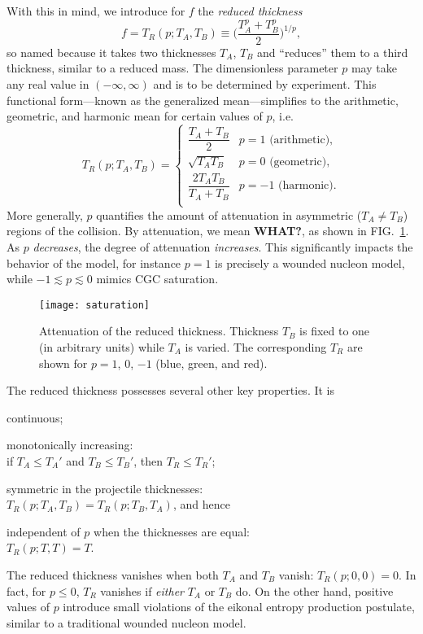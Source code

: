 \documentclass[aps,prl,reprint,amsmath,nofootinbib]{revtex4-1}
\begin{document}
With this in mind, we introduce for $f$ the \emph{reduced thickness}
\begin{equation}
  f = T_R(p; T_A, T_B) \equiv \biggl( \frac{T_A^p + T_B^p}{2} \biggr)^{1/p},
  \label{eq:tr}
\end{equation}
so named because it takes two thicknesses $T_A$, $T_B$ and ``reduces'' them to a third thickness, similar to a
reduced mass.  The dimensionless parameter $p$ may take any real value in $(-\infty, \infty)$ and is to be
determined by experiment.  This functional form---known as the generalized mean---simplifies to the arithmetic,
geometric, and harmonic mean for certain values of $p$, i.e.
\begin{equation}
  T_R(p; T_A, T_B) =
  \begin{cases}
    \dfrac{T_A + T_B}{2} & p = 1 \text{ (arithmetic)}, \\[2ex]
    \sqrt{T_A T_B} & p = 0 \text{ (geometric)}, \\[2ex]
    \dfrac{2 T_A T_B}{T_A + T_B} & p = -1 \text{ (harmonic)}. \\
  \end{cases}
\end{equation}
More generally, $p$ quantifies the amount of attenuation in asymmetric ($T_A \neq T_B$) regions of the
collision.  By attenuation, we mean \textbf{WHAT?}, as shown in FIG.~\ref{fig:saturation}.  As $p$
\emph{decreases}, the degree of attenuation \emph{increases}.  This significantly impacts the behavior of the
model, for instance $p=1$ is precisely a wounded nucleon model, while $-1 \lesssim p \lesssim 0$ mimics CGC
saturation.

\begin{figure}[t]
  \texttt{[image: saturation]}
  \caption{
    \label{fig:saturation}
    Attenuation of the reduced thickness.  Thickness $T_B$ is fixed to one (in arbitrary units) while $T_A$ is
    varied.  The corresponding $T_R$ are shown for $p = 1$, 0, $-1$ (blue, green, and red).
  }
\end{figure}

The reduced thickness possesses several other key properties.  It is
\begin{itemize*}
  \item continuous;
  \item monotonically increasing:  \\
    if $T_A \leq T_A'$ and $T_B \leq T_B'$, then $T_R \leq T_R'$;
  \item symmetric in the projectile thicknesses: \\
    $T_R(p; T_A, T_B) = T_R(p; T_B, T_A)$, and hence
  \item independent of $p$ when the thicknesses are equal: \\
    $T_R(p; T, T) = T$.
  \item The reduced thickness vanishes when both $T_A$ and $T_B$ vanish: $T_R(p; 0, 0) = 0$.  In fact, for $p
    \leq 0$, $T_R$ vanishes if \emph{either} $T_A$ or $T_B$ do.  On the other hand, positive values of $p$
    introduce small violations of the eikonal entropy production postulate, similar to a traditional wounded
    nucleon model.
\end{itemize*}
\end{document}

